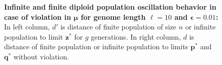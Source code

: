 \begin{figure}[h]
\begin{center}
\hspace{-3em}%
\vspace{-0.5em}  \hspace{-3em}%


\caption{\textbf{Infinite and finite diploid population oscillation behavior in case of violation in $\bm{\mu}$ for genome length $\ell = 10$ and $\bm{\epsilon} = 0.01$:} 
  In left column, $d'$ is distance of finite population of size $n$ or infinite population to limit $\bm{z}^\ast$ for $g$ generations. In right column, $d$ is distance of finite population or infinite population to limits $\bm{p}^\ast$ and $\bm{q}^\ast$ without violation.}
\label{oscillation_10d_vio_mu_0.01}
\end{center}
\end{figure}

